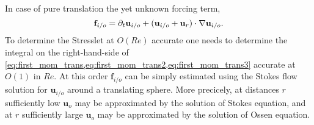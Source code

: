 In case of pure translation the yet unknown forcing term,
\begin{equation}
    \textbf{f}_{i/o} =
    \partial_t \textbf{u}_{i/o}
    + (\textbf{u}_{i/o}+\textbf{u}_r)\cdot \mathbf{\nabla} \textbf{u}_{i/o}.
\end{equation}
To determine the Stresslet at $O(Re)$ accurate one needs to determine the integral on the right-hand-side of \ref{eq:first_mom_trans,eq:first_mom_trans2,eq:first_mom_trans3} accurate at $O(1)$ in $Re$.
At this order $\textbf{f}_{i/o}$ can be simply estimated using the Stokes flow solution for $\textbf{u}_{i/o}$ around a translating sphere.
More precicely, at distances $r$ sufficiently low  $\textbf{u}_o$ may be approximated by the solution of Stokes equation, and at $r$ sufficiently large $\textbf{u}_o$ may be approximated by the solution of Ossen equation.

